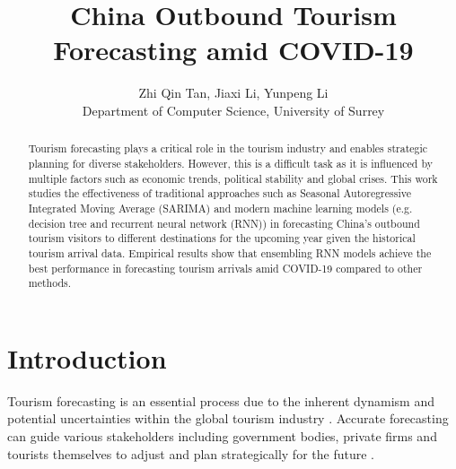 \documentclass{article}
\title{China Outbound Tourism Forecasting amid COVID-19}
\author[1]{Zhi Qin Tan, Jiaxi Li, Yunpeng Li \\
Department of Computer Science, University of Surrey}
\date{}
\begin{document}
\maketitle

\begin{abstract}
Tourism forecasting plays a critical role in the tourism industry and enables strategic planning for diverse stakeholders. However, this is a difficult task as it is influenced by multiple factors such as economic trends, political stability and global crises. 
This work studies the effectiveness of traditional approaches such as Seasonal Autoregressive Integrated Moving Average (SARIMA) and modern machine learning models (e.g. decision tree and recurrent neural network (RNN)) in forecasting China's outbound tourism visitors to different destinations for the upcoming year given the historical tourism arrival data. Empirical results show that ensembling RNN models achieve the best performance in forecasting tourism arrivals amid COVID-19 compared to other methods.
\end{abstract}

\section{Introduction}
Tourism forecasting is an essential process due to the inherent dynamism and potential uncertainties within the global tourism industry \cite{hassani2017forecasting}. 
Accurate forecasting can guide various stakeholders including government bodies, private firms and tourists themselves to adjust and plan strategically for the future \cite{peng2014meta, chatziantoniou2016forecasting, shahrabi2013developing}. 
\end{document}
